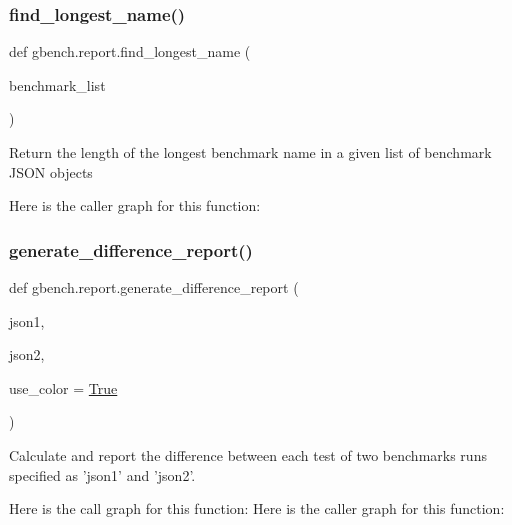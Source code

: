 \subsubsection{\texorpdfstring{find\+\_\+longest\+\_\+name()}{find\_longest\_name()}}
{\footnotesize\ttfamily def gbench.\+report.\+find\+\_\+longest\+\_\+name (\begin{DoxyParamCaption}\item[{}]{benchmark\+\_\+list }\end{DoxyParamCaption})}

\begin{DoxyVerb}Return the length of the longest benchmark name in a given list of
benchmark JSON objects
\end{DoxyVerb}
 Here is the caller graph for this function\+:
\mbox{\label{namespacegbench_1_1report_a62f7cd3872dbabd4959bec16b1696ce4}} 
\subsubsection{\texorpdfstring{generate\+\_\+difference\+\_\+report()}{generate\_difference\_report()}}
{\footnotesize\ttfamily def gbench.\+report.\+generate\+\_\+difference\+\_\+report (\begin{DoxyParamCaption}\item[{}]{json1,  }\item[{}]{json2,  }\item[{}]{use\+\_\+color = {\ttfamily \mbox{\hyperlink{struct_true}{True}}} }\end{DoxyParamCaption})}

\begin{DoxyVerb}Calculate and report the difference between each test of two benchmarks
runs specified as 'json1' and 'json2'.
\end{DoxyVerb}
 Here is the call graph for this function\+:
Here is the caller graph for this function\+:
